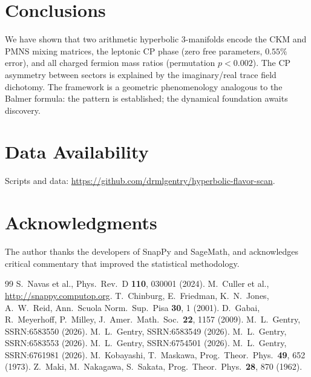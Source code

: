 \documentclass[11pt,a4paper]{article}
\theoremstyle{definition}
\theoremstyle{remark}
\begin{document}
\section{Conclusions}
\label{sec:conclusions}

We have shown that two arithmetic hyperbolic 3-manifolds encode the
CKM and PMNS mixing matrices, the leptonic CP phase (zero free
parameters, $0.55\%$ error), and all charged fermion mass ratios
(permutation $p<0.002$). The CP asymmetry between sectors is
explained by the imaginary/real trace field dichotomy.
The framework is a geometric phenomenology analogous to the Balmer
formula: the pattern is established; the dynamical foundation
awaits discovery.

\section*{Data Availability}

Scripts and data: \url{https://github.com/drmlgentry/hyperbolic-flavor-scan}.

\section*{Acknowledgments}

The author thanks the developers of SnapPy and SageMath,
and acknowledges critical commentary that improved the
statistical methodology.

\begin{thebibliography}{99}
 S.~Navas et al., Phys.\ Rev.\ D \textbf{110}, 030001 (2024).
 M.~Culler et al., \url{http://snappy.computop.org}.
 T.~Chinburg, E.~Friedman, K.~N.~Jones, A.~W.~Reid,
  Ann.\ Scuola Norm.\ Sup.\ Pisa \textbf{30}, 1 (2001).
 D.~Gabai, R.~Meyerhoff, P.~Milley,
  J.\ Amer.\ Math.\ Soc.\ \textbf{22}, 1157 (2009).
 M.~L.~Gentry, SSRN:6583550 (2026).
 M.~L.~Gentry, SSRN:6583549 (2026).
 M.~L.~Gentry, SSRN:6583553 (2026).
 M.~L.~Gentry, SSRN:6754501 (2026).
 M.~L.~Gentry, SSRN:6761981 (2026).
 M.~Kobayashi, T.~Maskawa, Prog.\ Theor.\ Phys.\ \textbf{49}, 652 (1973).
 Z.~Maki, M.~Nakagawa, S.~Sakata, Prog.\ Theor.\ Phys.\ \textbf{28}, 870 (1962).
\end{thebibliography}
\end{document}
